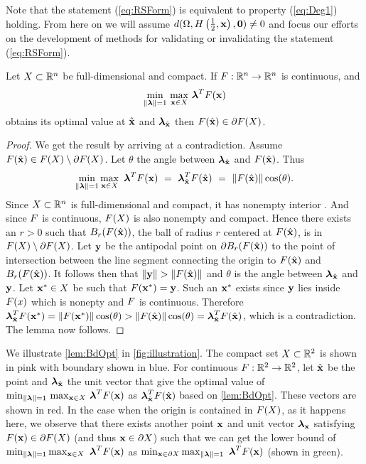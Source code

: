 Note that the statement (\ref{eq:RSForm}) is equivalent to property (\ref{eq:Deg1}) holding.
From here on we will assume $d(\Omega,H\left(\frac{1}{2},\mathbf{x}\right),\mathbf{0})\neq 0$ and focus our efforts on the development of methods for validating or invalidating the statement (\ref{eq:RSForm}).

\begin{lem} 
  \label{lem:BdOpt}
  Let $X\subset\mathbb{R}^n$ be full-dimensional and compact. If $F:\mathbb{R}^n\rightarrow\mathbb{R}^n$ is continuous, and 
  \[
  \min\limits_{\lVert\boldsymbol{\lambda}\rVert=1} \, \max\limits_{\mathbf{x}\in X} \, \boldsymbol{\lambda}^TF(\mathbf{x})
  \]
  obtains its optimal value at $\hat{\mathbf{x}}$ and $\boldsymbol{\lambda}_{\hat{\mathbf{x}}}$ then $F(\hat{\mathbf{x}})\in \partial F(X)$. 
\end{lem}

\begin{proof} 
  We get the result by arriving at a contradiction.
  Assume $F(\hat{\mathbf{x}})\in F(X)\setminus\partial F(X)$. 
  Let $\theta$ the angle between $\boldsymbol{\lambda}_{\hat{\mathbf{x}}}$ and $F(\hat{\mathbf{x}})$. 
  Thus
  \[
  \min\limits_{\lVert\boldsymbol{\lambda}\rVert=1}\max\limits_{\mathbf{x}\in X}\ \boldsymbol{\lambda}^TF(\mathbf{x}) ~=~ \boldsymbol{\lambda}_{\hat{\mathbf{x}}}^TF(\hat{\mathbf{x}}) ~=~ \lVert F(\hat{\mathbf{x}})\rVert\cos(\theta).
  \]
  Since $X\subset\mathbb{R}^n$ is full-dimensional and compact, it has nonempty interior \cite{Ma1973}.
  And since $F$ is continuous, $F(X)$ is also nonempty and compact. 
  Hence there exists an $r>0$ such that  $B_r(F(\hat{\mathbf{x}}))$, the ball of radius $r$ centered at $F(\hat{\mathbf{x}})$, is in $F(X)\setminus\partial F(X)$. 
  Let $\mathbf{y}$ be the antipodal point on $\partial B_r(F(\hat{\mathbf{x}}))$ to the point of intersection between the line segment connecting the origin to $F(\hat{\mathbf{x}})$ and $B_r(F(\hat{\mathbf{x}}))$. 
  It follows then that $\lVert\mathbf{y}\rVert>\lVert F(\hat{\mathbf{x}})\rVert$ and $\theta$ is the angle between $\boldsymbol{\lambda}_{\hat{\mathbf{x}}}$ and $\mathbf{y}$.   
  Let $\mathbf{x}^*\in X$ be such that $F(\mathbf{x}^*)=\mathbf{y}$.
  Such an $\mathbf{x}^*$ exists since $\mathbf{y}$ lies inside $F(x)$ which is nonepty and $F$ is continuous. 
  Therefore $\boldsymbol{\lambda}_{\hat{\mathbf{x}}}^TF(\mathbf{x}^*)=\lVert F(\mathbf{x}^*)\rVert \cos(\theta) > \lVert F(\hat{\mathbf{x}})\rVert \cos(\theta) = \boldsymbol{\lambda}_{\hat{\mathbf{x}}}^TF(\hat{\mathbf{x}})$, which is a contradiction. 
  The lemma now follows.
\end{proof}

We illustrate \cref{lem:BdOpt} in \cref{fig:illustration}.
The compact set $X\subset\mathbb{R}^2$ is shown in pink with boundary shown in blue.
For continuous $F:\mathbb{R}^2 \rightarrow \mathbb{R}^2$, let $\hat{\mathbf{x}}$ be the point and $\boldsymbol{\lambda}_{\hat{\mathbf{x}}}$ the unit vector that give the optimal value of $\min_{\lVert\boldsymbol{\lambda}\rVert=1} \, \max_{\mathbf{x}\in X} \, \boldsymbol{\lambda}^TF(\mathbf{x})$ as $\boldsymbol{\lambda}_{\hat{\mathbf{x}}}^TF(\hat{\mathbf{x}})$ based on \cref{lem:BdOpt}.
These vectors are shown in red.
In the case when the origin is contained in $F(X)$, as it happens here, we observe that there exists another point $\mathbf{x}$ and unit vector $\boldsymbol{\lambda}_{\mathbf{x}}$ satisfying $F(\mathbf{x}) \in \partial F(X)$ (and thus $\mathbf{x}\in \partial X$) such that we can get the lower bound of $\min_{\norm{\vlambda}=1}\max_{\vx\in X}\ \vlambda^T\vF(\vx)$ as $\min_{\mathbf{x}\in \partial X} \max_{\lVert\boldsymbol{\lambda}\rVert=1}\ \boldsymbol{\lambda}^TF(\mathbf{x})$ (shown in green).


